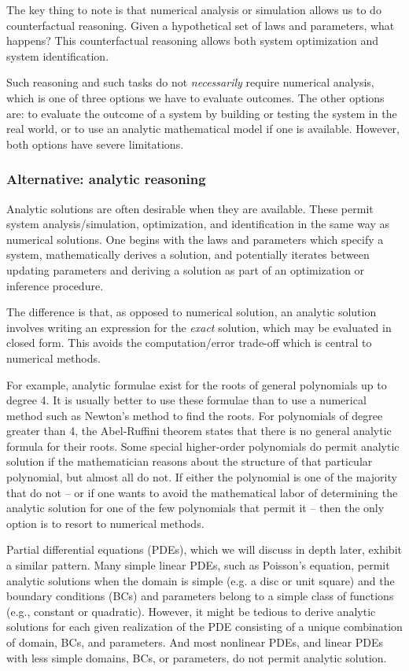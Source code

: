 \documentclass{puthesis}
\begin{document}
The key thing to note is that numerical analysis or simulation allows us to do
counterfactual reasoning.
Given a hypothetical set of laws and parameters, what happens?
This counterfactual reasoning allows both system optimization and system identification.

Such reasoning and such tasks do not \emph{necessarily} require numerical analysis,
which is one of three options we have to evaluate outcomes.
The other options are: to evaluate the outcome of a system by building or testing the
system in the real world, or to use an analytic mathematical model
if one is available.
However, both options have severe limitations.

\subsubsection{Alternative: analytic reasoning}
Analytic solutions are often desirable when they are available.
These permit system analysis/simulation, optimization, and identification
in the same way as numerical solutions.
One begins with the laws and parameters which specify a system,
mathematically derives a solution,
and potentially iterates between updating parameters and deriving a solution
as part of an optimization or inference procedure.

The difference is that, as opposed to numerical solution, an analytic solution
involves writing an expression for the \emph{exact} solution,
which may be evaluated in closed form.
This avoids the computation/error trade-off which
is central to numerical methods.

For example, analytic formulae exist for the roots of general polynomials up to degree 4.
It is usually better to use these formulae than to
use a numerical method such as Newton's method to find the roots.
For polynomials of degree greater than 4, the Abel-Ruffini theorem states that there
is no general analytic formula for their roots.
Some special higher-order polynomials do permit analytic solution if the mathematician reasons
about the structure of that particular polynomial, but almost all do not. If either the polynomial is one of the
majority that do not -- or if one wants to avoid the mathematical labor of determining
the analytic solution for one of the few polynomials that permit it -- then the only
option is to resort to numerical methods.

Partial differential equations (PDEs), which we will discuss in depth later, exhibit a
similar pattern.
Many simple linear PDEs, such as Poisson's equation, permit analytic solutions
when the domain is simple (e.g. a disc or unit square) and the boundary conditions (BCs)
and parameters belong to a simple class of functions (e.g., constant or quadratic).
However, it might be tedious to derive analytic solutions for each given realization
 of the PDE consisting of a unique combination of domain, BCs, and parameters.
And most nonlinear PDEs, and
linear PDEs with less simple domains, BCs, or parameters,
do not permit analytic solution.
\end{document}
